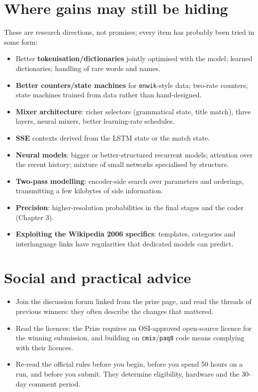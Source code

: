 \documentclass[11pt,a4paper,openany]{book}
\newcommand{\code}[1]{\texttt{#1}}
\theoremstyle{definition}
\theoremstyle{remark}
\begin{document}
\section{Where gains may still be hiding}

These are research directions, not promises; every item has probably been tried in some form:
\begin{itemize}
\item Better \textbf{tokenisation/dictionaries} jointly optimised with the model; learned dictionaries; handling of rare words and names.
\item \textbf{Better counters/state machines} for \code{enwik}-style data; two-rate counters; state machines trained from data rather than hand-designed.
\item \textbf{Mixer architecture}: richer selectors (grammatical state, title match), three layers, neural mixers, better learning-rate schedules.
\item \textbf{SSE} contexts derived from the LSTM state or the match state.
\item \textbf{Neural models}: bigger or better-structured recurrent models; attention over the recent history; mixture of small networks specialised by structure.
\item \textbf{Two-pass modelling}: encoder-side search over parameters and orderings, transmitting a few kilobytes of side information.
\item \textbf{Precision}: higher-resolution probabilities in the final stages and the coder (Chapter 3).
\item \textbf{Exploiting the Wikipedia 2006 specifics}: templates, categories and interlanguage links have regularities that dedicated models can predict.
\end{itemize}

\section{Social and practical advice}

\begin{itemize}
\item Join the discussion forum linked from the prize page, and read the threads of previous winners: they often describe the changes that mattered.
\item Read the licences: the Prize requires an OSI-approved open-source licence for the winning submission, and building on \code{cmix}/\code{paq8} code means complying with their licences.
\item Re-read the official rules before you begin, before you spend 50 hours on a run, and before you submit. They determine eligibility, hardware and the 30-day comment period.
\end{itemize}
\end{document}
